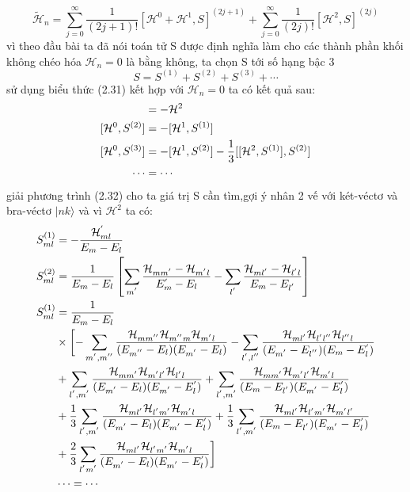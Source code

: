    \begin{equation}
  \tilde{\mathcal{H}}_n  = \sum_{j=0}^{\infty}\frac{1}{(2j+1)!}[\mathcal{H}^0 +\mathcal{H}^1,S]^{(2j+1)}+\sum_{j=0}^{\infty}\frac{1}{(2j)!}[\mathcal{H}^2,S]^{(2j)}
  \end{equation}
  vì theo đầu bài ta đã nói toán tử S được định nghĩa làm cho các thành phần khối không chéo hóa $\mathcal{H}_n =0$ là bằng không, ta chọn S tới số hạng bậc 3
  \begin{equation}
  S =S^{(1)} +S^{(2)} +S^{(3)} +\cdots
  \end{equation}  
  sử dụng biểu thức (2.31) kết hợp với $\mathcal{H}_n =0$ ta có kết quả sau:
  \begin{align}
  [\mathcal{H}^0,S^{(1)}] &= -\mathcal{H}^2 \notag\\
  [\mathcal{H}^0,S^{(2)}] &= -[\mathcal{H}^1,S^{(1)}] \notag\\
  [\mathcal{H}^0,S^{(3)}] &= -[\mathcal{H}^1,S^{(2)}] -\frac{1}{3}[[\mathcal{H}^2,S^{(1)}],S^{(2)}] \notag\\
  \cdots &= \cdots
  \end{align}
  giải phương trình (2.32) cho ta giá trị S cần tìm,gợi ý nhân 2 vế với két-véctơ và bra-véctơ $\vert nk\rangle$ và vì $\mathcal{H}^2$ ta có:
   \begin{align}
   S_{ml}^{(1)} &=-\frac{\mathcal{H}_{ml}^{'}}{E_m -E_l} \notag\\
   S_{ml}^{(2)}&= \frac{1}{E_m -E_l}\left[\sum_{m^{'}}\frac{\mathcal{H}_{mm^{'}}-\mathcal{H}_{m^{'}l}}{E_m^{'} -E_l}- \sum_{l^{'}}\frac{\mathcal{H}_{ml^{'}}-\mathcal{H}_{l^{'}l}}{E_m -E_{l^{'}}} \right]\notag\\
   S_{ml}^{(1)} &=\frac{1}{E_m -E_l}\notag\\
   &\times \biggl[-\sum_{m^{'},m^{''}}\frac{\mathcal{H}_{mm^{''}}\mathcal{H}_{m^{''}m}\mathcal{H}_{m^{'}l}}{(E_{m^{''}}-E_{l})(E_{m^{'}}-E_l)} 
  -\sum_{l^{'},l^{''}}\frac{\mathcal{H}_{ml^{'}}\mathcal{H}_{l^{'}l^{''}}\mathcal{H}_{l^{''}l}}{(E_{m^{'}}-E_{l^{''}})(E_{m}-E_l^{'})} \notag\\
  &+\sum_{l^{'},m^{'}}\frac{\mathcal{H}_{mm^{'}}\mathcal{H}_{m^{'}l^{'}}\mathcal{H}_{l^{'}l}}{(E_{m^{'}}-E_{l})(E_{m^{'}}-E_l^{'})} 
  +\sum_{l^{'},m^{'}}\frac{\mathcal{H}_{mm^{'}}\mathcal{H}_{m^{'}l^{'}}\mathcal{H}_{m^{'}l}}{(E_{m}-E_{l^{'}})(E_{m^{'}}-E_l^{'})}\notag\\
  &+\frac{1}{3}\sum_{l^{'},m^{'}}\frac{\mathcal{H}_{ml^{'}}\mathcal{H}_{l^{'}m^{'}}\mathcal{H}_{m^{'}l}}{(E_{m^{'}}-E_{l})(E_{m^{'}}-E_l^{'})} 
  +\frac{1}{3}\sum_{l^{'},m^{'}}\frac{\mathcal{H}_{ml^{'}}\mathcal{H}_{l^{'}m^{'}}\mathcal{H}_{m^{'}l^{'}}}{(E_{m}-E_{l^{'}})(E_{m^{'}}-E_l^{'})}\notag\\
  &+\frac{2}{3}\sum_{l^{'}m^{'}}\frac{\mathcal{H}_{ml^{'}}\mathcal{H}_{l^{'}m^{'}}\mathcal{H}_{m^{'}l}}{(E_{m^{'}}-E_{l})(E_{m^{'}}-E_l^{'})} \biggr]\notag \\
  &\cdots = \cdots
   \end{align}

